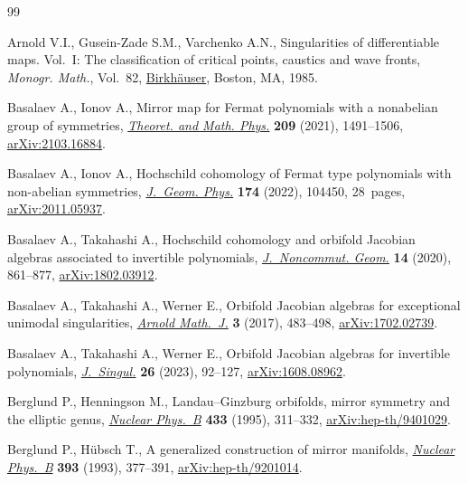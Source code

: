 \documentclass[pdftex]{sigma}
\numberwithin{equation}{section}
\begin{document}
\begin{thebibliography}{99}
\footnotesize\itemsep=0pt

Arnold V.I., Gusein-Zade S.M., Varchenko A.N., Singularities of differentiable
 maps. {V}ol.~{I}: The classification of critical points, caustics and wave
 fronts, \textit{Monogr. Math.}, Vol.~82, \href{https://doi.org/10.1007/978-1-4612-5154-5}{Birkh\"auser}, Boston, MA, 1985.

Basalaev A., Ionov A., Mirror map for {F}ermat polynomials with a nonabelian
 group of symmetries, \href{https://doi.org/10.1134/S0040577921110015}{\textit{Theoret. and Math. Phys.}} \textbf{209} (2021),
 1491--1506, \href{https://arxiv.org/abs/2103.16884}{arXiv:2103.16884}.

Basalaev A., Ionov A., Hochschild cohomology of {F}ermat type polynomials with
 non-abelian symmetries, \href{https://doi.org/10.1016/j.geomphys.2021.104450}{\textit{J.~Geom. Phys.}} \textbf{174} (2022), 104450,
 28~pages, \href{https://arxiv.org/abs/2011.05937}{arXiv:2011.05937}.

Basalaev A., Takahashi A., Hochschild cohomology and orbifold {J}acobian
 algebras associated to invertible polynomials, \href{https://doi.org/10.4171/jncg/370}{\textit{J.~Noncommut. Geom.}}
 \textbf{14} (2020), 861--877, \href{https://arxiv.org/abs/1802.03912}{arXiv:1802.03912}.

Basalaev A., Takahashi A., Werner E., Orbifold {J}acobian algebras for
 exceptional unimodal singularities, \href{https://doi.org/10.1007/s40598-017-0076-8}{\textit{Arnold Math.~J.}} \textbf{3}
 (2017), 483--498, \href{https://arxiv.org/abs/1702.02739}{arXiv:1702.02739}.

Basalaev A., Takahashi A., Werner E., Orbifold {J}acobian algebras for
 invertible polynomials, \href{https://doi.org/10.5427/jsing.2023.26f}{\textit{J.~Singul.}} \textbf{26} (2023), 92--127,
 \href{https://arxiv.org/abs/1608.08962}{arXiv:1608.08962}.

Berglund P., Henningson M., Landau--{G}inzburg orbifolds, mirror symmetry and
 the elliptic genus, \href{https://doi.org/10.1016/0550-3213(94)00389-V}{\textit{Nuclear Phys.~B}} \textbf{433} (1995), 311--332,
 \href{https://arxiv.org/abs/hep-th/9401029}{arXiv:hep-th/9401029}.

Berglund P., H\"ubsch T., A generalized construction of mirror manifolds,
 \href{https://doi.org/10.1016/0550-3213(93)90250-S}{\textit{Nuclear Phys.~B}} \textbf{393} (1993), 377--391,
 \href{https://arxiv.org/abs/hep-th/9201014}{arXiv:hep-th/9201014}.


\end{thebibliography}
\end{document}
